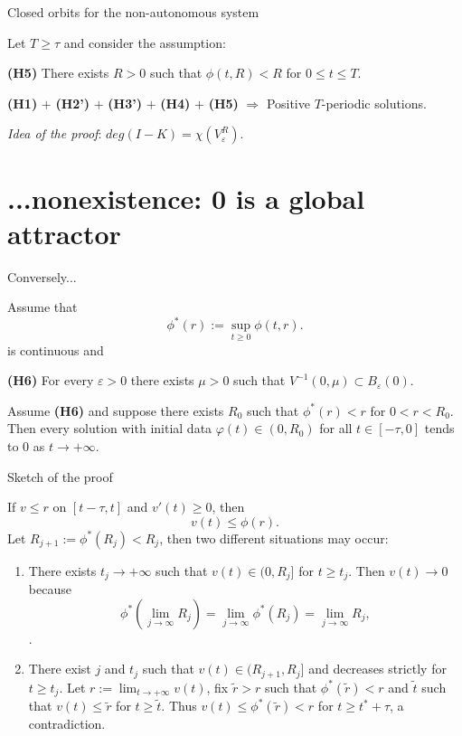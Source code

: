 \documentclass[spanish]{beamer}
\def \le{\leqslant}
\def \ge{\geqslant}
\begin{document}
\begin{frame}{Closed orbits for the non-autonomous system}
    
Let $T\ge \tau$ and consider the assumption: 

\medskip

{\bf (H5)} 
There exists $R>0$ such that $\phi(t,R)<R$ for $0\le t\le T$. 

\bigskip 
\begin{theorem}
    {\bf (H1)} $+$ 
{\bf (H2')}
$+$ 
{\bf (H3')}
$+$ 
{\bf (H4)} $+$  {\bf (H5)}
$\Longrightarrow$ {Positive $T$-periodic solutions}.
\end{theorem}

\pause 
\textit{Idea of the proof}: $deg(I-K)= \chi(V_\varepsilon^R)$.
\end{frame}


\section{...nonexistence: 0 is a global attractor}

\begin{frame}{
Conversely...}
    
    Assume that 
    $$
\phi^*(r):= \sup_{t\ge 0} \phi(t,r).
$$
is continuous and

\medskip 

{\bf (H6)} 
For every $\varepsilon>0$
there exists $\mu>0$ such that $V^{-1}(0, \mu) \subset B_\varepsilon(0)$. 

\begin{theorem}

Assume  {\bf (H6)} and suppose  there exists $R_0$ such that  $\phi^*(r)<r$ for $0<r<R_0$. 
Then every solution with initial data $\varphi(t)\in (0,R_0)$ for all $t\in [-\tau,0]$ tends to $0$ as $t\to +\infty$.  

\end{theorem}

\end{frame}

\begin{frame}{Sketch of the proof}
    
If $v\le r$ on $[t-\tau, t]$ and
$v'(t)\ge 0$, then 
$$
v(t) \le \phi(r). 
$$
Let $R_{j+1}:= {\phi^*(R_j)}<R_j$, then two different situations may occur:

\begin{enumerate}
    \item There exists $t_j\to +\infty$ such that $v(t)\in (0,R_j]$ for $t\ge t_j$. Then $v(t)\to 0$ because
$$
\phi^*(\lim_{j\to \infty} R_j) = \lim_{j\to \infty} \phi^*(R_j)= \lim_{j\to \infty} R_j, 
$$.     
\item There exist $j$ and $t_j$ such that $v(t) \in (R_{j+1},R_j]$ and decreases strictly for $t\ge t_j$. Let 
 $r:=\lim_{t\to+\infty} v(t)$, fix $\tilde r>r$ such that $\phi^*(\tilde r)<r$ and $\tilde t$ such that $v(t)\le \tilde r$ for $t\ge \tilde t$. Thus 
$v(t)\le \phi^*(\tilde r)<r$ for $t\ge t^*+\tau$, a contradiction. 

\end{enumerate}

    
\end{frame}
\end{document}
